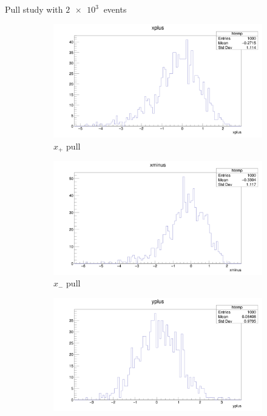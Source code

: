 \documentclass{beamer}
\begin{document}
\begin{frame}{Pull study with $\SI{2e3}{}$ events}
  \begin{figure}
    \centering
    \vspace{-0.2cm}
    \begin{subfigure}{0.5\textwidth}
      \includegraphics[width = 1.0\textwidth]{NaivePulls/xplus1K1K.png}
      \caption{$x_+$ pull}
    \end{subfigure}%
    \begin{subfigure}{0.5\textwidth}
      \includegraphics[width = 1.0\textwidth]{NaivePulls/xminus1K1K.png}
      \caption{$x_-$ pull}
    \end{subfigure}
    \begin{subfigure}{0.5\textwidth}
      \includegraphics[width = 1.0\textwidth]{NaivePulls/yplus1K1K.png}

\end{subfigure}
\end{figure}
\end{frame}
\end{document}
